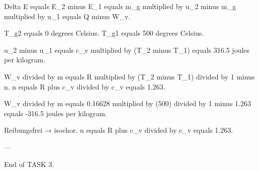 Delta E equals E_2 minus E_1 equals m_g multiplied by u_2 minus m_g multiplied by u_1 equals Q minus W_v.  

T_g2 equals 0 degrees Celsius.  
T_g1 equals 500 degrees Celsius.  

u_2 minus u_1 equals c_v multiplied by (T_2 minus T_1) equals 316.5 joules per kilogram.  

W_v divided by m equals R multiplied by (T_2 minus T_1) divided by 1 minus n.  
n equals R plus c_v divided by c_v equals 1.263.  

W_v divided by m equals 0.16628 multiplied by (500) divided by 1 minus 1.263 equals -316.5 joules per kilogram.  

Reibungsfrei → isochor.  
n equals R plus c_v divided by c_v equals 1.263.  

---

End of TASK 3.